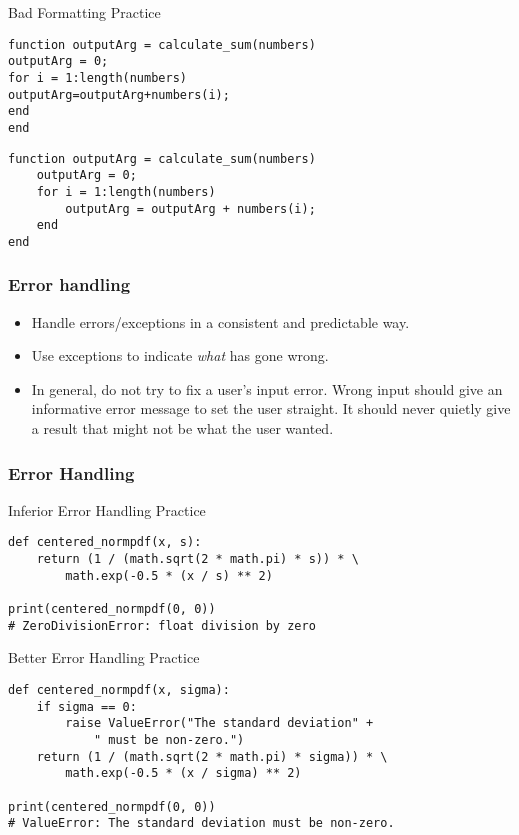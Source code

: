 \documentclass{beamer}
\begin{document}
\begin{frame}[fragile]{Bad Formatting Practice}
\begin{lstlisting}[style=MATLAB]
function outputArg = calculate_sum(numbers)
outputArg = 0;
for i = 1:length(numbers)
outputArg=outputArg+numbers(i);
end
end
\end{lstlisting}


\hrulefill


\begin{lstlisting}[style=MATLAB]
function outputArg = calculate_sum(numbers)
    outputArg = 0;
    for i = 1:length(numbers)
        outputArg = outputArg + numbers(i);
    end
end
\end{lstlisting}
\end{frame}


\begin{frame}[fragile]
\frametitle{Error handling}

\begin{itemize}
\item Handle errors/exceptions in a consistent and predictable way.
\item Use exceptions to indicate \emph{what} has gone wrong.
\item In general, do not try to fix a user's input error.  Wrong input should give an informative error message to set the user straight.  It should never quietly give a result that might not be what the user wanted.
\end{itemize}
\end{frame}


\begin{frame}[fragile]
\frametitle{Error Handling}

Inferior Error Handling Practice
\begin{lstlisting}[style=Python]
def centered_normpdf(x, s):
    return (1 / (math.sqrt(2 * math.pi) * s)) * \
        math.exp(-0.5 * (x / s) ** 2)

print(centered_normpdf(0, 0))
# ZeroDivisionError: float division by zero
\end{lstlisting}


Better Error Handling Practice
\begin{lstlisting}[style=Python]
def centered_normpdf(x, sigma):
    if sigma == 0:
        raise ValueError("The standard deviation" + 
            " must be non-zero.")
    return (1 / (math.sqrt(2 * math.pi) * sigma)) * \
        math.exp(-0.5 * (x / sigma) ** 2)

print(centered_normpdf(0, 0))
# ValueError: The standard deviation must be non-zero.

\end{lstlisting}

\end{frame}
\end{document}
